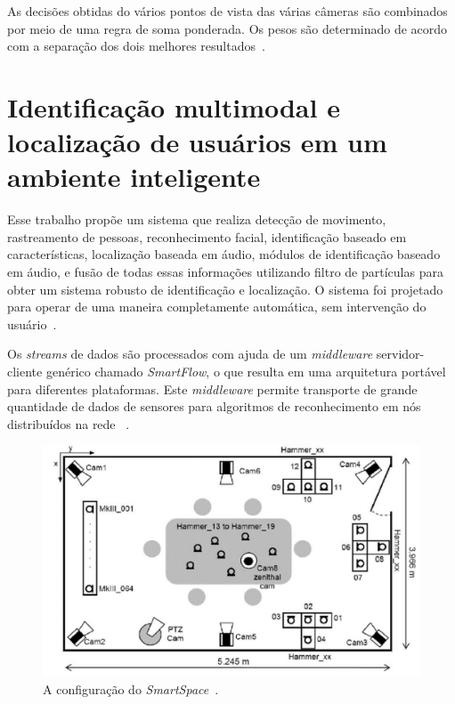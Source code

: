 As decisões obtidas do vários pontos de vista das várias câmeras são combinados por meio de uma regra de soma ponderada. Os pesos são determinado de acordo com a separação dos dois melhores resultados~\cite{chil}.




\section{Identificação multimodal e localização de usuários em um ambiente inteligente}

Esse trabalho propõe um sistema que realiza detecção de movimento, rastreamento de pessoas, reconhecimento facial, identificação baseado em características, localização baseada em áudio, módulos de identificação baseado em áudio, e fusão de todas essas informações utilizando filtro de partículas para obter um sistema robusto de identificação e localização. O sistema foi projetado para operar de uma maneira completamente automática, sem intervenção do usuário~\cite{salah}.

Os \textit{streams} de dados são processados com ajuda de um \textit{middleware} servidor-cliente genérico chamado \textit{SmartFlow}, o que resulta em uma arquitetura portável para diferentes plataformas. Este \textit{middleware} permite transporte de grande quantidade de dados de sensores para algoritmos de reconhecimento em nós distribuídos na rede ~\cite{salah}.

	\begin{figure}[hbt]
		\begin{center}
			\includegraphics[scale=0.4]{figuras/3.TrabalhosCorrelatos/upc.png}
		\end{center}
		\caption{A configuração do \textit{SmartSpace}~\cite{salah}.}
		\label{upc}
	\end{figure}

